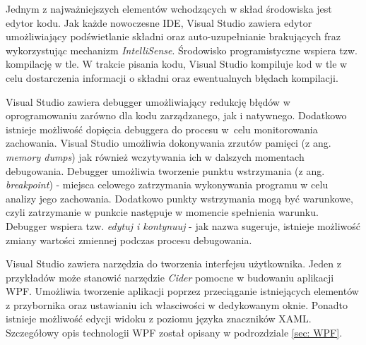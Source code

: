 Jednym z najważniejszych elementów wchodzących w skład środowiska jest edytor kodu. Jak każde nowoczesne IDE, Visual Studio zawiera edytor umożliwiający podświetlanie składni oraz auto-uzupełnianie brakujących fraz wykorzystując mechanizm \textit{IntelliSense}. Środowisko programistyczne wspiera tzw. kompilację w tle. W trakcie pisania kodu, Visual Studio kompiluje kod w tle w celu dostarczenia informacji o składni oraz ewentualnych błędach kompilacji. 

Visual Studio zawiera debugger umożliwiający redukcję błędów w oprogramowaniu zarówno dla kodu zarządzanego, jak i natywnego. Dodatkowo istnieje możliwość dopięcia debuggera do procesu w~celu monitorowania zachowania. Visual Studio umożliwia dokonywania zrzutów pamięci (z ang. \textit{memory dumps}) jak również wczytywania ich w dalszych momentach debugowania. Debugger umożliwia tworzenie punktu wstrzymania (z ang. \textit{breakpoint}) - miejsca celowego zatrzymania wykonywania programu w celu analizy jego zachowania. Dodatkowo punkty wstrzymania mogą być warunkowe, czyli zatrzymanie w punkcie następuje w momencie spełnienia warunku. Debugger wspiera tzw. \textit{edytuj i kontynuuj} - jak nazwa sugeruje, istnieje możliwość zmiany wartości zmiennej podczas procesu debugowania.

Visual Studio zawiera narzędzia do tworzenia interfejsu użytkownika. Jeden z przykładów może stanowić narzędzie \textit{Cider} pomocne w budowaniu aplikacji WPF. Umożliwia tworzenie aplikacji poprzez przeciąganie istniejących elementów z przybornika oraz ustawianiu ich własciwości w dedykowanym oknie. Ponadto istnieje możliwość edycji widoku z poziomu języka znaczników XAML. Szczegółowy opis technologii WPF został opisany w podrozdziale \ref{sec: WPF}.

















